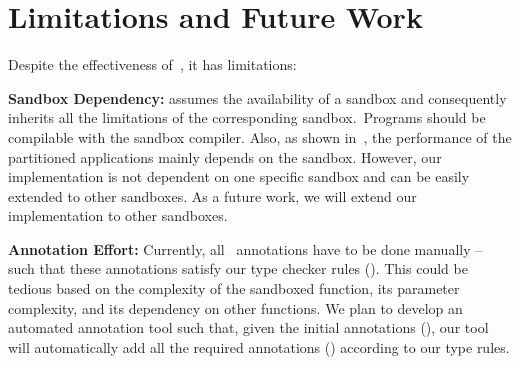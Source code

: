 \section{Limitations and Future Work}
\label{sec:limitations}
Despite the effectiveness of~\systemname{}, it has limitations:

\noindent\textbf{Sandbox Dependency:} \systemname{} assumes the availability of a sandbox and consequently inherits all the limitations of the corresponding sandbox.~\eg Programs should be compilable with the sandbox compiler.
Also, as shown in~, the performance of the partitioned applications mainly depends on the sandbox.
However, our implementation is not dependent on one specific sandbox and can be easily extended to other sandboxes. As a future work, we will extend our implementation to other sandboxes.

\noindent\textbf{Annotation Effort:} Currently, all~ annotations have to be done manually -- such that these annotations satisfy our type checker rules ().
This could be tedious based on the complexity of the sandboxed function, its parameter complexity, and its dependency on other functions.
We plan to develop an automated annotation tool such that, given the initial annotations (), our tool will automatically add all the required annotations () according to our type rules.
